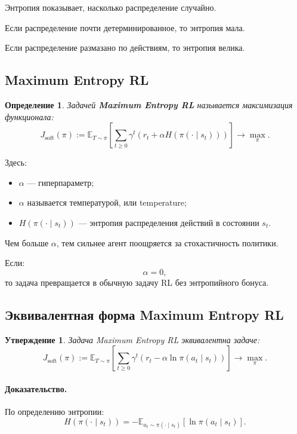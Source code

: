 \documentclass[12pt,a4paper]{article}
\newtheorem{definition}{Определение}
\newtheorem{statement}{Утверждение}
\begin{document}
Энтропия показывает, насколько распределение случайно.

Если распределение почти детерминированное, то энтропия мала.

Если распределение размазано по действиям, то энтропия велика.

\subsection{Maximum Entropy RL}

\begin{definition}
Задачей \textbf{Maximum Entropy RL} называется максимизация функционала:
\[
J_{\mathrm{soft}}(\pi)
:=
\mathbb E_{T\sim\pi}
\left[
\sum_{t\ge 0}
\gamma^t
\left(
r_t
+
\alpha H(\pi(\cdot\mid s_t))
\right)
\right]
\to
\max_{\pi}.
\]
\end{definition}

Здесь:
\begin{itemize}
    \item $\alpha$ --- гиперпараметр;
    \item $\alpha$ называется температурой, или temperature;
    \item $H(\pi(\cdot\mid s_t))$ --- энтропия распределения действий в состоянии $s_t$.
\end{itemize}

Чем больше $\alpha$, тем сильнее агент поощряется за стохастичность политики.

Если:
\[
\alpha=0,
\]
то задача превращается в обычную задачу RL без энтропийного бонуса.

\subsection{Эквивалентная форма Maximum Entropy RL}

\begin{statement}
Задача Maximum Entropy RL эквивалентна задаче:
\[
J_{\mathrm{soft}}(\pi)
:=
\mathbb E_{T\sim\pi}
\left[
\sum_{t\ge 0}
\gamma^t
\left(
r_t
-
\alpha \ln \pi(a_t\mid s_t)
\right)
\right]
\to
\max_{\pi}.
\]
\end{statement}

\paragraph{Доказательство.}

По определению энтропии:
\[
H(\pi(\cdot\mid s_t))
=
-
\mathbb E_{a_t\sim\pi(\cdot\mid s_t)}
\left[
\ln \pi(a_t\mid s_t)
\right].
\]
\end{document}

